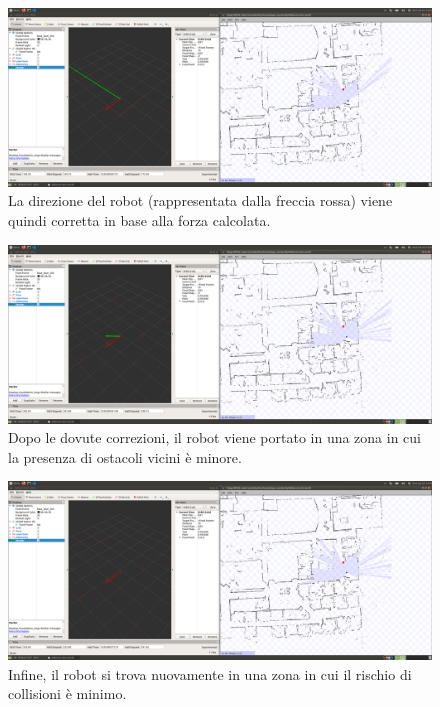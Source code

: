 \documentclass[Lau, binding=0.6cm, oneside]{sapthesis}
\begin{document}
\begin{figure}[htp]
    \centering
    \includegraphics[width=13.5cm]{rviz_force3.png}
    \caption{La direzione del robot (rappresentata dalla freccia rossa) viene quindi corretta in base alla forza calcolata.}
    \label{fig:rviz_force3}
\end{figure}
\begin{figure}[htp]
    \centering
    \includegraphics[width=13.5cm]{rviz_force4.png}
    \caption{Dopo le dovute correzioni, il robot viene portato in una zona in cui la presenza di ostacoli vicini è minore.}
    \label{fig:rviz_force4}
\end{figure}
\begin{figure}[htp]
    \centering
    \includegraphics[width=13.5cm]{rviz_force5.png}
    \caption{Infine, il robot si trova nuovamente in una zona in cui il rischio di collisioni è minimo.}
    \label{fig:rviz_force5}
\end{figure}
\end{document}
